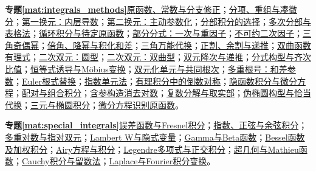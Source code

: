 \par\noindent\textbf{专题\ref{mat:integrals_methods}}\quad \hyperref[mat:integrals_methods:i01]{原函数、常数与分支修正}；\hyperref[mat:integrals_methods:i02]{分项、重组与凑微分}；\hyperref[mat:integrals_methods:i03]{第一换元：内层导数}；\hyperref[mat:integrals_methods:i04]{第二换元：主动参数化}；\hyperref[mat:integrals_methods:i05]{分部积分的选择}；\hyperref[mat:integrals_methods:i06]{多次分部与表格法}；\hyperref[mat:integrals_methods:i07]{循环积分与待定原函数}；\hyperref[mat:integrals_methods:i08]{部分分式：一次与重因子}；\hyperref[mat:integrals_methods:i09]{不可约二次因子}；\hyperref[mat:integrals_methods:i10]{三角奇偶幂}；\hyperref[mat:integrals_methods:i11]{倍角、降幂与积化和差}；\hyperref[mat:integrals_methods:i12]{三角万能代换}；\hyperref[mat:integrals_methods:i13]{正割、余割与递推}；\hyperref[mat:integrals_methods:i14]{双曲函数有理式}；\hyperref[mat:integrals_methods:i15]{二次双元：圆型}；\hyperref[mat:integrals_methods:i16]{二次双元：双曲型}；\hyperref[mat:integrals_methods:i17]{双元降次与递推}；\hyperref[mat:integrals_methods:i18]{分式构型与齐次比值}；\hyperref[mat:integrals_methods:i19]{恒等式诱导与Möbius变换}；\hyperref[mat:integrals_methods:i20]{双元化单元与共同根次}；\hyperref[mat:integrals_methods:i21]{多重根号：和差参数}；\hyperref[mat:integrals_methods:i22]{Euler根式替换}；\hyperref[mat:integrals_methods:i23]{指数单元法}；\hyperref[mat:integrals_methods:i24]{有理积分中的倒数对称}；\hyperref[mat:integrals_methods:i25]{隐函数积分与微分方程}；\hyperref[mat:integrals_methods:i26]{配对与组合积分}；\hyperref[mat:integrals_methods:i27]{含参构造消去对数}；\hyperref[mat:integrals_methods:i28]{复数分解与取实部}；\hyperref[mat:integrals_methods:i29]{伪椭圆构型与恰当代换}；\hyperref[mat:integrals_methods:i30]{三元与椭圆积分}；\hyperref[mat:integrals_methods:i31]{微分方程识别原函数}。\par
\par\noindent\textbf{专题\ref{mat:special_integrals}}\quad \hyperref[mat:special_integrals:erf]{误差函数与Fresnel积分}；\hyperref[mat:special_integrals:sici]{指数、正弦与余弦积分}；\hyperref[mat:special_integrals:polylog]{多重对数与指对双元}；\hyperref[mat:special_integrals:lambert]{Lambert W与隐式变量}；\hyperref[mat:special_integrals:gamma]{Gamma与Beta函数}；\hyperref[mat:special_integrals:bessel]{Bessel函数及加权积分}；\hyperref[mat:special_integrals:airy]{Airy方程与积分}；\hyperref[mat:special_integrals:legendre]{Legendre多项式与正交积分}；\hyperref[mat:special_integrals:hypergeom]{超几何与Mathieu函数}；\hyperref[mat:special_integrals:residue]{Cauchy积分与留数法}；\hyperref[mat:special_integrals:laplace]{Laplace与Fourier积分变换}。\par
